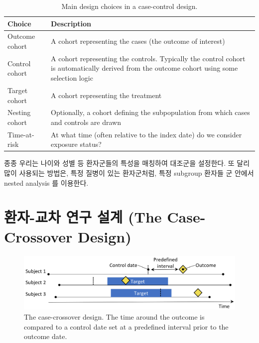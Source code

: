 \documentclass[11pt]{book}
\theoremstyle{definition}
\theoremstyle{definition}
\theoremstyle{definition}
\theoremstyle{remark}
\begin{document}
\begin{table}[t]

\caption{\label{tab:ccChoices}Main design choices in a case-control design.}
\centering
\begin{tabu} to 
\toprule
Choice & Description\\
\midrule
Outcome cohort & A cohort representing the cases (the outcome of interest)\\
Control cohort & A cohort representing the controls. Typically the control cohort is automatically derived from the outcome cohort using some selection logic\\
Target cohort & A cohort representing the treatment\\
Nesting cohort & Optionally, a cohort defining the subpopulation from which cases and controls are drawn\\
Time-at-risk & At what time (often relative to the index date) do we consider exposure status?\\
\bottomrule
\end{tabu}
\end{table}

종종 우리는 나이와 성별 등 환자군들의 특성을 매칭하여 대조군을 설정한다.
또 달리 많이 사용되는 방법은, 특정 질병이 있는 환자군처럼, 특정 subgroup
환자들 군 안에서 nested analysis 를 이용한다.

\section{환자-교차 연구 설계 (The Case-Crossover
Design)}\label{----the-case-crossover-design}


\begin{figure}[h]

{\centering \includegraphics[width=0.9\linewidth]{images/PopulationLevelEstimation/caseCrossover} 

}

\caption{The case-crossover design. The time around the outcome is compared to a control date set at a predefined interval prior to the outcome date.}\label{fig:caseCrossover}
\end{figure}
\end{document}
